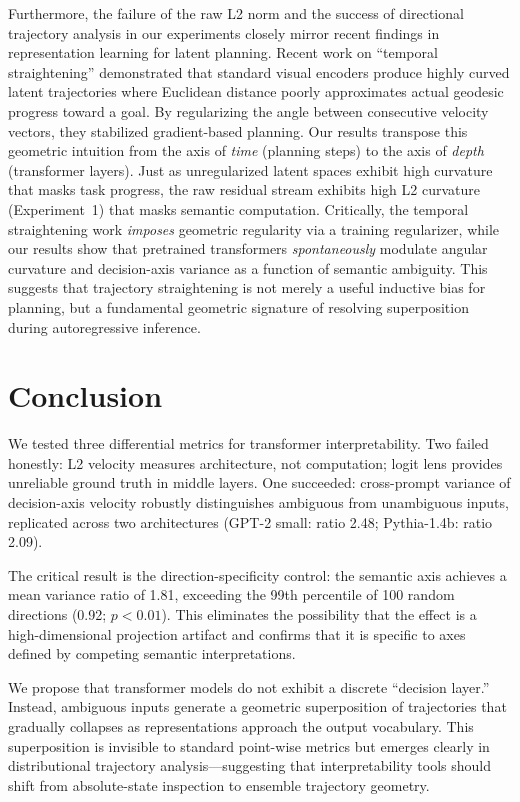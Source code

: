 \documentclass[11pt,a4paper]{article}
\begin{document}
Furthermore, the failure of the raw L2 norm and the success of directional trajectory analysis in our experiments closely mirror recent findings in representation learning for latent planning. Recent work on ``temporal straightening'' \citep{temporal_straightening_2026} demonstrated that standard visual encoders produce highly curved latent trajectories where Euclidean distance poorly approximates actual geodesic progress toward a goal. By regularizing the angle between consecutive velocity vectors, they stabilized gradient-based planning. Our results transpose this geometric intuition from the axis of \emph{time} (planning steps) to the axis of \emph{depth} (transformer layers). Just as unregularized latent spaces exhibit high curvature that masks task progress, the raw residual stream exhibits high L2 curvature (Experiment~1) that masks semantic computation. Critically, the temporal straightening work \emph{imposes} geometric regularity via a training regularizer, while our results show that pretrained transformers \emph{spontaneously} modulate angular curvature and decision-axis variance as a function of semantic ambiguity. This suggests that trajectory straightening is not merely a useful inductive bias for planning, but a fundamental geometric signature of resolving superposition during autoregressive inference.

\section{Conclusion}
\label{sec:conclusion}

We tested three differential metrics for transformer interpretability. Two failed honestly: L2 velocity measures architecture, not computation; logit lens provides unreliable ground truth in middle layers. One succeeded: cross-prompt variance of decision-axis velocity robustly distinguishes ambiguous from unambiguous inputs, replicated across two architectures (GPT-2 small: ratio 2.48; Pythia-1.4b: ratio 2.09).

The critical result is the direction-specificity control: the semantic axis achieves a mean variance ratio of 1.81, exceeding the 99th percentile of 100 random directions (0.92; $p < 0.01$). This eliminates the possibility that the effect is a high-dimensional projection artifact and confirms that it is specific to axes defined by competing semantic interpretations.

We propose that transformer models do not exhibit a discrete ``decision layer.'' Instead, ambiguous inputs generate a geometric superposition of trajectories that gradually collapses as representations approach the output vocabulary. This superposition is invisible to standard point-wise metrics but emerges clearly in distributional trajectory analysis---suggesting that interpretability tools should shift from absolute-state inspection to ensemble trajectory geometry.
\end{document}
